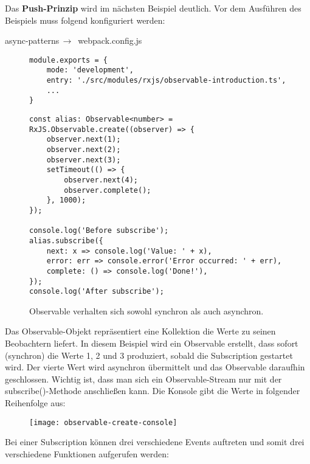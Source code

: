\noindent
Das \textbf{Push-Prinzip} wird im nächsten Beispiel deutlich. Vor dem Ausführen des Beispiels muss folgend konfiguriert werden:

\begin{center}
     async-patterns$\,\to\,$ webpack.config.js
\end{center}

\begin{figure}[H]
\begin{lstlisting}[basicstyle=\small]
module.exports = {
    mode: 'development',
    entry: './src/modules/rxjs/observable-introduction.ts',
    ...
}
\end{lstlisting}
\end{figure}

\begin{figure}[H]
\begin{lstlisting}[basicstyle=\small]
const alias: Observable<number> = RxJS.Observable.create((observer) => {
    observer.next(1);
    observer.next(2);
    observer.next(3);
    setTimeout(() => {
        observer.next(4);
        observer.complete();
    }, 1000);
});

console.log('Before subscribe');
alias.subscribe({
    next: x => console.log('Value: ' + x),
    error: err => console.error('Error occurred: ' + err),
    complete: () => console.log('Done!'),
});
console.log('After subscribe');
\end{lstlisting}
\caption{Observable verhalten sich sowohl synchron als auch asynchron.}
\end{figure}

\noindent
Das Observable-Objekt repräsentiert eine Kollektion die Werte zu seinen Beobachtern liefert. In diesem Beispiel wird ein Observable erstellt, dass sofort (synchron) die Werte 1, 2 und 3 produziert, sobald die Subscription gestartet wird. Der vierte Wert wird asynchron übermittelt und das Observable daraufhin geschlossen. Wichtig ist, dass man sich ein Observable-Stream nur mit der subscribe()-Methode anschließen kann. Die Konsole gibt die Werte in folgender Reihenfolge aus:

\begin{figure}[H]
\begin{center}
\texttt{[image: observable-create-console]}
\end{center}
\end{figure}

\noindent
Bei einer Subscription können drei verschiedene Events auftreten und somit drei verschiedene Funktionen aufgerufen werden:

